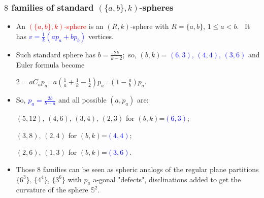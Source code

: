 \documentclass{beamer}
\begin{document}
\begin{frame}\frametitle{$8$ families of standard $(\{a,b\},k)$-spheres}



\begin{itemize}

\item An \textcolor{red}{$(\{a,b\},k)$-sphere} is an  $(R,k)$-sphere
with $R=\{a,b\}$, $1\le a < b$. $\,$ 
It has  \textcolor{blue}{$v$$=$$\frac{1}{k}(ap_a+bp_b)$} vertices.
\item 
Such standard sphere has $b=\frac{2k}{k-2}$;$\,$
 so, $(b,k)$=
\textcolor{blue}{$(6,3),\,(4,4),\,(3,6)$} 
and
Euler formula become

$2=aC_ap_a$=$a(\frac{1}{a}+\frac{1}{k}-\frac{1}{2})p_a$=$
(1-\frac{a}{b})p_a$.

 
 



\item So, \textcolor{blue}{$p_a=\frac{2b}{b-a}$}
and all possible
$(a,p_a)$ are:

 $(5,12),\, (4,6),\, (3,4),\, (2,3)$ for 
$(b,k)$=\textcolor{blue}{$(6,3)$};
         
$(3,8),\, (2,4)$ for $(b,k)$=\textcolor{blue}{$(4,4)$}; $\,\,$

$(2,6),\, (1,3)$ for $(b,k)$=\textcolor{blue}{$(3,6)$}.

\item Those $8$ families can be seen  as spheric analogs of the 
regular plane partitions $\{6^3\},\,\{4^4\},\,\{3^6\}$ with $p_a$ a-gonal
"defects", disclinations  added to get the curvature
of the sphere $\mathbb{S}^2$.


 \end{itemize}\end{frame}
\end{document}
